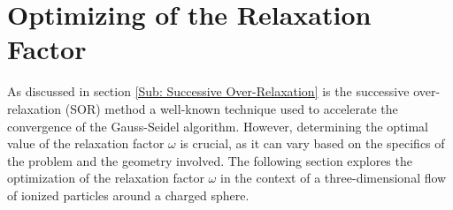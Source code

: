 \section{Optimizing of the Relaxation Factor}
\label{Sec: Optimizing Relaxation Factor}

As discussed in section \ref{Sub: Successive Over-Relaxation} is the successive over-relaxation (\acs{SOR}) method a well-known technique used to accelerate the convergence of the Gauss-Seidel algorithm. However, determining the optimal value of the relaxation factor $\omega$ is crucial, as it can vary based on the specifics of the problem and the geometry involved. The following section explores the optimization of the relaxation factor $\omega$ in the context of a three-dimensional flow of ionized particles around a charged sphere.

